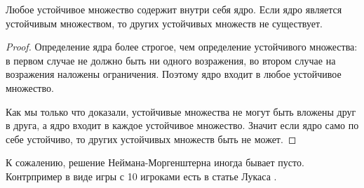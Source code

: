 \begin{myth}
Любое устойчивое множество содержит внутри себя ядро. Если ядро является устойчивым множеством, то других устойчивых множеств не существует.
\end{myth}
\begin{proof}
Определение ядра более строгое, чем определение устойчивого множества: в первом случае не должно быть ни одного возражения, во втором случае на возражения наложены ограничения. Поэтому ядро входит в любое устойчивое множество.

Как мы только что доказали, устойчивые множества не могут быть вложены друг в друга, а ядро входит в каждое устойчивое множество. Значит если ядро само по себе устойчиво, то других устойчивых множеств быть не может.
\end{proof}

К сожалению, решение Неймана-Моргенштерна иногда бывает пусто. Контрпример в виде игры с 10 игроками есть в статье Лукаса \cite{lucas:gns}.
\nocite{lemaire:cgtia}




